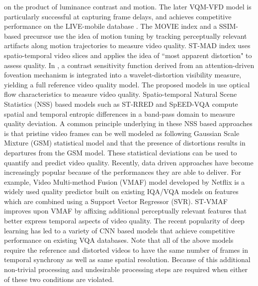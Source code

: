 \documentclass[journal]{IEEEtran}
\begin{document}
on the product of luminance contrast and motion. The later VQM-VFD \cite{pinson2014temporal} model is particularly successful at capturing frame delays, and achieves competitive performance on the LIVE-mobile database \cite{moorthy2012video}. The MOVIE index \cite{seshadrinathan2009motion} and a SSIM-based precursor \cite{seshadrinathan2007structural} use the idea of motion tuning by tracking perceptually relevant artifacts along motion trajectories to measure video quality. ST-MAD \cite{vu2011spatiotemporal} index uses spatio-temporal video slices and applies the idea of ``most apparent distortion" \cite{larson2010most} to assess quality. In \cite{you2013attention}, a contrast sensitivity function derived from an attention-driven foveation mechanism is integrated into a wavelet-distortion visibility measure, yielding a full reference video quality model. The proposed models in \cite{ortiz2014full,manasa2016optical} use optical flow characteristics to measure video quality. Spatio-temporal Natural Scene Statistics (NSS) based models such as ST-RRED \cite{soundararajan2012video} and SpEED-VQA \cite{bampis2017speed} compute spatial and temporal entropic differences in a band-pass domain to measure quality deviation. A common principle underlying in these NSS based approaches is that pristine video frames can be well modeled as following Gaussian Scale Mixture (GSM) statistical model and that the presence of distortions results in departures from the GSM model. These statistical deviations can be used to quantify and predict video quality. Recently, data driven approaches have become increasingly popular because of the performances they are able to deliver. For example, Video Multi-method Fusion (VMAF) \cite{VMAF2016} model developed by Netflix is a widely used quality predictor built on existing IQA/VQA models on features which are combined using a Support Vector Regressor (SVR). ST-VMAF \cite{bampis2018spatiotemporal} improves upon VMAF by affixing additional perceptually relevant features that better express temporal aspects of video quality. The recent popularity of deep learning has led to a variety of CNN based models \cite{kim2018deep,becker2019neural,xu2020c3dvqa} that achieve competitive performance on existing VQA databases. Note that all of the above models require the reference and distorted videos to have the same number of frames in temporal synchrony as well as same spatial resolution. Because of this additional non-trivial processing and undesirable processing steps are required when either of these two conditions are violated.  
\end{document}
